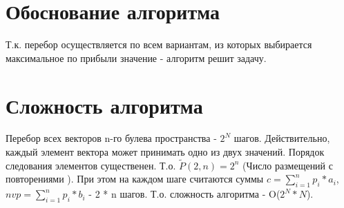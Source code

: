 \documentclass[a4paper,12pt]{article}
\begin{document}
\section{Обоснование алгоритма}
Т.к. перебор осуществляется по всем вариантам, из которых выбирается максимальное по прибыли значение - алгоритм решит задачу.

\section{Сложность алгоритма}
Перебор всех векторов n-го булева пространства - $2^{N}$ шагов. Действительно, каждый элемент вектора может принимать одно из двух значений. 
Порядок следования элементов существенен. Т.о. $\widetilde{P}(2, n) = 2^{n}$ (Число размещений с повторениями \cite{discr_math}). При этом на каждом шаге считаются суммы $c = \sum_{i=1}^{n} p_{i} * {a_i}$, $nvp = \sum_{i=1}^{n} p_{i} * {b_i}$ - 2 * n шагов. Т.о. сложность алгоритма - O($2^{N} * N$).
\end{document}
